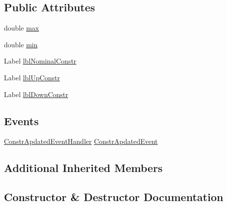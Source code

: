 \subsection*{Public Attributes}
\begin{DoxyCompactItemize}
\item 
double \mbox{\hyperlink{class_dimension___chain_1_1_u_i___constr_dimension_aa81df927b2b21106b0cbea8061a976be}{max}}
\item 
double \mbox{\hyperlink{class_dimension___chain_1_1_u_i___constr_dimension_aa4a7d8c97f9b60e388ff077bda093bae}{min}}
\item 
Label \mbox{\hyperlink{class_dimension___chain_1_1_u_i___constr_dimension_a565f224e437467d9575b55807b739d88}{lbl\+Nominal\+Constr}}
\item 
Label \mbox{\hyperlink{class_dimension___chain_1_1_u_i___constr_dimension_a09b6b3ccc0a3d464a5cafe34b38e9ab9}{lbl\+Up\+Constr}}
\item 
Label \mbox{\hyperlink{class_dimension___chain_1_1_u_i___constr_dimension_a3d01bbd22dcac507866e69d4c104318d}{lbl\+Down\+Constr}}
\end{DoxyCompactItemize}
\subsection*{Events}
\begin{DoxyCompactItemize}
\item 
\mbox{\hyperlink{class_dimension___chain_1_1_u_i___constr_dimension_afb6b60fe4836094dcbf61d6347f94b24}{Constr\+Apdated\+Event\+Handler}} \mbox{\hyperlink{class_dimension___chain_1_1_u_i___constr_dimension_aaf06553821087aeeddf8ac8c2e3b47ff}{Constr\+Apdated\+Event}}
\end{DoxyCompactItemize}
\subsection*{Additional Inherited Members}


\subsection{Constructor \& Destructor Documentation}
\mbox{\label{class_dimension___chain_1_1_u_i___constr_dimension_a5a5a38f79b3822a6912010066cc1636b}} 
